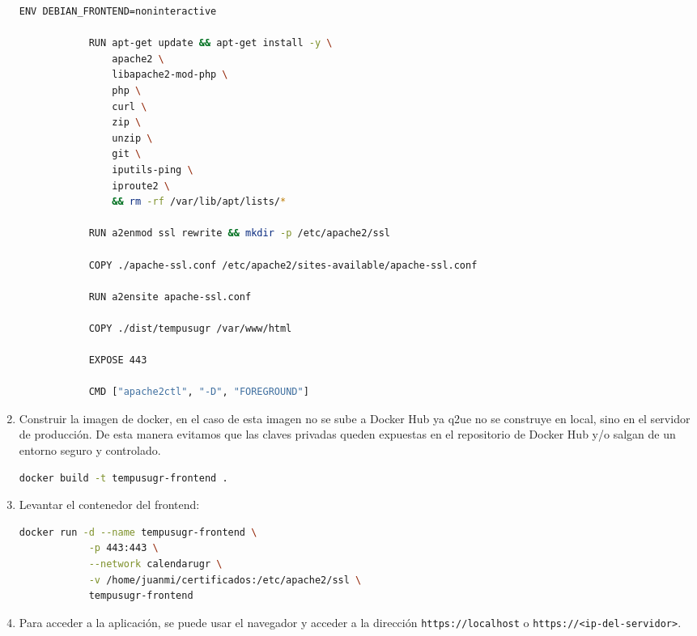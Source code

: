 \begin{enumerate}
\begin{lstlisting}[language=bash]
            ENV DEBIAN_FRONTEND=noninteractive

            RUN apt-get update && apt-get install -y \
                apache2 \
                libapache2-mod-php \
                php \
                curl \
                zip \
                unzip \
                git \
                iputils-ping \
                iproute2 \
                && rm -rf /var/lib/apt/lists/*

            RUN a2enmod ssl rewrite && mkdir -p /etc/apache2/ssl

            COPY ./apache-ssl.conf /etc/apache2/sites-available/apache-ssl.conf

            RUN a2ensite apache-ssl.conf

            COPY ./dist/tempusugr /var/www/html

            EXPOSE 443

            CMD ["apache2ctl", "-D", "FOREGROUND"]
        \end{lstlisting}
    \item Construir la imagen de docker, en el caso de esta imagen no se sube a Docker Hub ya q2ue no se construye en local, sino en el servidor de producción.
           De esta manera evitamos que las claves privadas queden expuestas en el repositorio de Docker Hub y/o salgan de un entorno seguro y controlado.
    \begin{lstlisting}[language=bash]
        docker build -t tempusugr-frontend .
    \end{lstlisting}
    \item Levantar el contenedor del frontend:
    \begin{lstlisting}[language=bash]
        docker run -d --name tempusugr-frontend \
            -p 443:443 \
            --network calendarugr \
            -v /home/juanmi/certificados:/etc/apache2/ssl \
            tempusugr-frontend
    \end{lstlisting}
    \item Para acceder a la aplicación, se puede usar el navegador y acceder a la dirección \texttt{https://localhost} o \texttt{https://<ip-del-servidor>}.
\end{enumerate}